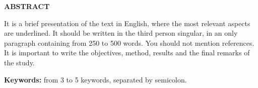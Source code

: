 
\thispagestyle{empty}
\begin{center}
  \vspace*{.95cm}
  \textbf{ABSTRACT}
\end{center}

\vspace{2.5cm}
\noindent
\leading{5.5mm}
It is a brief presentation of the text in English, where the most relevant
aspects are underlined. It should be written in the third person singular, in an
only paragraph containing from 250 to 500 words. You should not mention
references. It is important to write the objectives, method, results and the
final remarks of the study.

\vspace{1.3cm}

\noindent
\textbf{Keywords:} from 3 to 5 keywords, separated by semicolon.